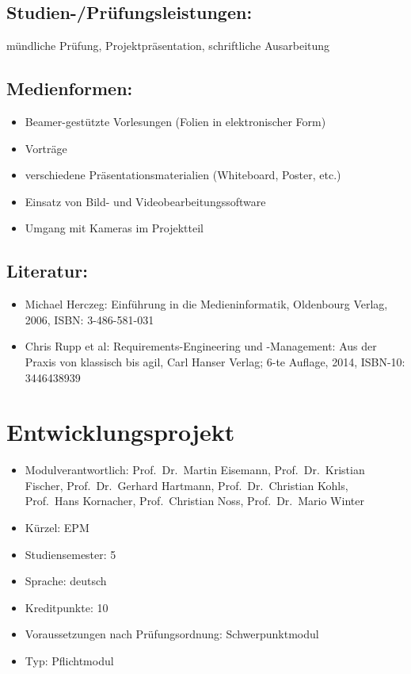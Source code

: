 \section*{Studien-/Prüfungsleistungen:}\label{studien-pruxfcfungsleistungen-8}

mündliche Prüfung, Projektpräsentation, schriftliche Ausarbeitung

\section*{Medienformen:}\label{medienformen-5}

\begin{itemize}
\tightlist
\item
  Beamer-gestützte Vorlesungen (Folien in elektronischer Form)
\item
  Vorträge
\item
  verschiedene Präsentationsmaterialien (Whiteboard, Poster, etc.)
\item
  Einsatz von Bild- und Videobearbeitungssoftware
\item
  Umgang mit Kameras im Projektteil
\end{itemize}

\section*{Literatur:}\label{literatur-7}

\begin{itemize}
\tightlist
\item
  Michael Herczeg: Einführung in die Medieninformatik, Oldenbourg
  Verlag, 2006, ISBN: 3-486-581-031
\item
  Chris Rupp et al: Requirements-Engineering und -Management: Aus der
  Praxis von klassisch bis agil, Carl Hanser Verlag; 6-te Auflage, 2014,
  ISBN-10: 3446438939
\end{itemize}

\chapter{Entwicklungsprojekt}\label{entwicklungsprojekt}

\begin{itemize}
\tightlist
\item
  Modulverantwortlich: Prof.~Dr.~Martin Eisemann, Prof.~Dr.~Kristian
  Fischer, Prof.~Dr.~Gerhard Hartmann, Prof.~Dr.~Christian Kohls,
  Prof.~Hans Kornacher, Prof.~Christian Noss, Prof.~Dr.~Mario Winter
\item
  Kürzel: EPM
\item
  Studiensemester: 5
\item
  Sprache: deutsch
\item
  Kreditpunkte: 10
\item
  Voraussetzungen nach Prüfungsordnung: Schwerpunktmodul
\item
  Typ: Pflichtmodul
\end{itemize}

